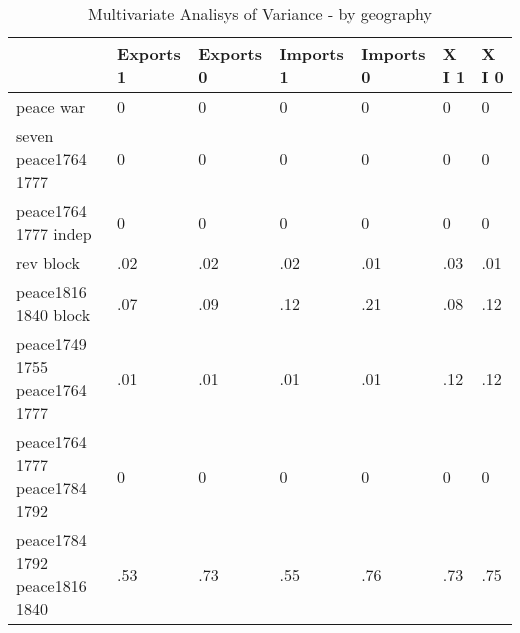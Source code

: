 \begin{table}[htbp]
\caption{\label{tab:manova_test_pays} Multivariate Analisys of Variance - by geography}\centering\medskip
\begin{tabular}{|l|l|l|l|l|l|l|}\hline  
 & Exports 1  & Exports 0  & Imports 1  & Imports 0  & X I 1  & X I 0  \\ \hline  
peace war & 0 & 0 & 0 & 0 & 0 & 0 \\ \hline 
seven peace1764 1777 & 0 & 0 & 0 & 0 & 0 & 0 \\ \hline 
peace1764 1777 indep & 0 & 0 & 0 & 0 & 0 & 0 \\ \hline 
rev block & .02 & .02 & .02 & .01 & .03 & .01 \\ \hline 
peace1816 1840 block & .07 & .09 & .12 & .21 & .08 & .12 \\ \hline 
peace1749 1755 peace1764 1777 & .01 & .01 & .01 & .01 & .12 & .12 \\ \hline 
peace1764 1777 peace1784 1792 & 0 & 0 & 0 & 0 & 0 & 0 \\ \hline 
peace1784 1792 peace1816 1840 & .53 & .73 & .55 & .76 & .73 & .75 \\ \hline 
  \end{tabular}
\end{table}
